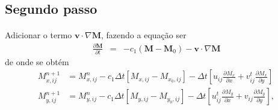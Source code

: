 \documentclass[eletromagnetismo.tex]{subfiles}
\begin{document}
\subsection{Segundo passo}
\paragraph{} Adicionar o termo $\mathbf{v}\cdot \nabla \mathbf{M}$, fazendo a equação ser \begin{eqnarray}
	\frac{\partial \mathbf{M}}{\partial t} & = & -c_1(\mathbf{M} - \mathbf{M}_0) - \mathbf{v}\cdot\nabla \mathbf{M}
\end{eqnarray} de onde se obtém \begin{align}
M_{x,ij}^{n+1} & = M_{x,ij}^n -c_1\Delta t[M_{x,ij} - M_{x_0,ij}] -\Delta t \left[u_{ij}\frac{\partial M_x}{\partial x} + v_{ij}^t\frac{\partial M_x}{\partial y}\right]\\
M_{y,ij}^{n+1} & = M_{y,ij}^n -c_1\Delta t[M_{y,ij} - M_{y_0,ij}]-\Delta t \left[u_{ij}^t\frac{\partial M_y}{\partial x} + v_{ij}\frac{\partial M_y}{\partial y}\right], 
\end{align}

%
\end{document}
